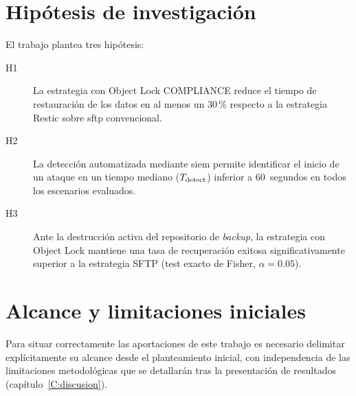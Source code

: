 \documentclass[../main.tex]{subfiles}
\begin{document}
\section{Hipótesis de investigación}

El trabajo plantea tres hipótesis:

\begin{description}
  \item[H1] La estrategia con Object Lock COMPLIANCE reduce el tiempo de
  restauración de los datos en al menos un 30\,\% respecto a la estrategia
  Restic sobre \gls{sftp} convencional.

  \item[H2] La detección automatizada mediante \gls{siem} permite
  identificar el inicio de un ataque en un tiempo mediano ($T_{\text{detect}}$)
  inferior a 60~segundos en todos los escenarios evaluados.

  \item[H3] Ante la destrucción activa del repositorio de \textit{backup},
  la estrategia con Object Lock mantiene una tasa de recuperación exitosa
  significativamente superior a la estrategia SFTP (test exacto de Fisher,
  $\alpha = 0.05$).
\end{description}

\section{Alcance y limitaciones iniciales}

Para situar correctamente las aportaciones de este trabajo es necesario
delimitar explícitamente su alcance desde el planteamiento inicial, con
independencia de las limitaciones metodológicas que se detallarán tras la
presentación de resultados (capítulo~\ref{C:discusion}).
\end{document}

